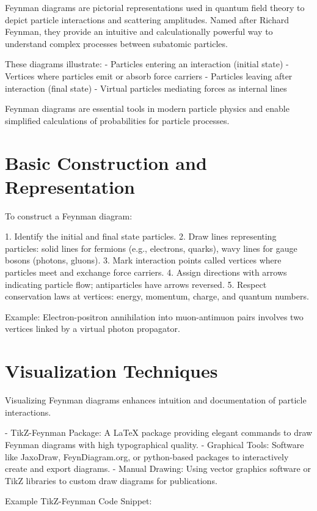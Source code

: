 \documentclass[12pt]{book}
\begin{document}
Feynman diagrams are pictorial representations used in quantum field theory to depict particle interactions and scattering amplitudes. Named after Richard Feynman, they provide an intuitive and calculationally powerful way to understand complex processes between subatomic particles.

These diagrams illustrate:
- Particles entering an interaction (initial state)
- Vertices where particles emit or absorb force carriers
- Particles leaving after interaction (final state)
- Virtual particles mediating forces as internal lines

Feynman diagrams are essential tools in modern particle physics and enable simplified calculations of probabilities for particle processes.

\section{Basic Construction and Representation}

To construct a Feynman diagram:

1. Identify the initial and final state particles.
2. Draw lines representing particles: solid lines for fermions (e.g., electrons, quarks), wavy lines for gauge bosons (photons, gluons).
3. Mark interaction points called vertices where particles meet and exchange force carriers.
4. Assign directions with arrows indicating particle flow; antiparticles have arrows reversed.
5. Respect conservation laws at vertices: energy, momentum, charge, and quantum numbers.

Example: Electron-positron annihilation into muon-antimuon pairs involves two vertices linked by a virtual photon propagator.

\section{Visualization Techniques}

Visualizing Feynman diagrams enhances intuition and documentation of particle interactions.

- TikZ-Feynman Package: A LaTeX package providing elegant commands to draw Feynman diagrams with high typographical quality.
- Graphical Tools: Software like JaxoDraw, FeynDiagram.org, or python-based packages to interactively create and export diagrams.
- Manual Drawing: Using vector graphics software or TikZ libraries to custom draw diagrams for publications.

Example TikZ-Feynman Code Snippet:
\end{document}
